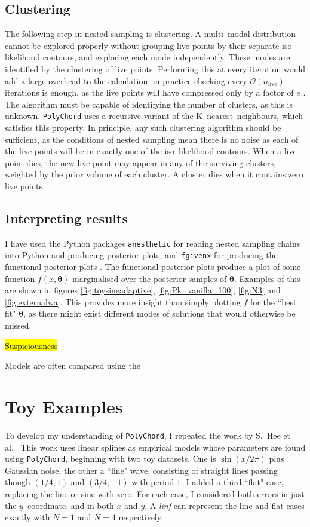 \documentclass{article}
\begin{document}
\subsection{Clustering}

The following step in nested sampling is clustering. A multi--modal distribution cannot be explored properly without grouping live points by their separate iso--likelihood contours, and exploring each mode independently. These modes are identified by the clustering of live points. Performing this at every iteration would add a large overhead to the calculation; in practice checking every $\mathcal{O}(n_\textrm{live})$ iterations is enough, as the live points will have compressed only by a factor of $e$ \cite{PolyChord_1}. The algorithm must be capable of identifying the number of clusters, as this is unknown. \texttt{PolyChord} uses a recursive variant of the K--nearest--neighbours, which satisfies this property. In principle, any such clustering algorithm should be sufficient, as the conditions of nested sampling mean there is no noise as each of the live points will be in exactly one of the iso--likelihood contours. When a live point dies, the new live point may appear in any of the surviving clusters, weighted by the prior volume of each cluster. A cluster dies when it contains zero live points.

\subsection{Interpreting results}

I have used the Python packages \texttt{anesthetic} for reading nested sampling chains into Python and producing posterior plots, and \texttt{fgivenx} for producing the functional posterior plots \cite{anesthetic, fgivenx}. The functional posterior plots produce a plot of some function $f(x, \bm\theta)$ marginalised over the posterior samples of $\bm\theta$. Examples of this are shown in figures \ref{fig:toysineadaptive}, 
\ref{fig:Pk_vanilla_100}, \ref{fig:N3} and \ref{fig:externalwa}. This provides more insight than simply plotting $f$ for the ``best fit" $\bm\theta$, as there might exist different modes of solutions that would otherwise be missed.

\hl{Suspiciousness}

Models are often compared using the 

\section{Toy Examples}
\label{toyexamples}
To develop my understanding of \texttt{PolyChord}, I repeated the work by S.~Hee et al.\ \cite{Sonke} This work uses linear splines as empirical models whose parameters are found using \texttt{PolyChord}, beginning with two toy datasets. One is $\sin\left({x/2\pi}\right)$ plus Gaussian noise, the other a ``line" wave, consisting of straight lines passing though $(1/4, 1)$ and $(3/4, -1)$ with period $1$. I added a third ``flat" case, replacing the line or sine with zero. For each case, I considered both errors in just the $y$--coordinate, and in both $x$ and $y$. A \textit{linf} can represent the line and flat cases exactly with $N=1$ and $N=4$ respectively.
\end{document}
